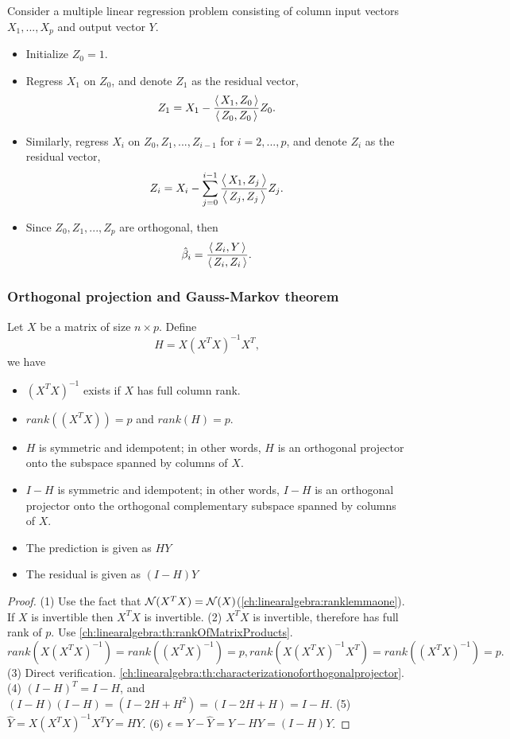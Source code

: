 \begin{refsection}
\begin{method}
Consider a multiple linear regression problem consisting of column input vectors $X_1,...,X_p$ and output vector $Y$.	
\begin{itemize}
	\item Initialize $Z_0 = 1$.
	\item Regress $X_1$ on $Z_0$, and denote $Z_1$ as the residual vector,
	$$Z_1 = X_1 - \frac{{\left< \, X_1,Z_0 \, \right>}}{{\left< \, Z_0,Z_0 \, \right>}}Z_0.$$
	\item Similarly, regress $X_i$ on $Z_0,Z_1,...,Z_{i-1}$ for $i=2,...,p$, and denote $Z_i$ as the residual vector,
	$$Z_i = X_i - \sum_{j=0}^{i-1}\frac{{\left< \, X_1,Z_j \, \right>}}{{\left< \, Z_j,Z_j \, \right>}}Z_j.$$
	
	\item Since $Z_0,Z_1,...,Z_p$ are orthogonal, then 
	$$\hat{\beta}_i =  \frac{ {\left< \, Z_i,Y \, \right>}}{{\left< \, Z_i,Z_i \, \right>}}.$$
\end{itemize}
\end{method}


\subsubsection{Orthogonal projection and Gauss-Markov theorem}

\begin{lemma}\label{ch:theory-of-statistics:th:propertylinearregression}
	Let $X$ be a matrix of size $n\times p$. 
	Define $$H = X(X^TX)^{-1}X^T,$$ we have
	\begin{itemize}
		\item $(X^TX)^{-1}$ exists if $X$ has full column rank.
		\item $rank((X^TX)) = p$ and $rank(H) = p$.
		\item $H$ is symmetric and idempotent; in other words, $H$ is an orthogonal projector onto the subspace spanned by columns of $X$.
		\item $I-H$ is symmetric and idempotent; in other words, $I-H$ is an orthogonal projector onto the orthogonal complementary subspace spanned by columns of $X$.
		\item The prediction is given as $HY$
		\item The residual is given as $(I-H)Y$
	\end{itemize}
\end{lemma}
\begin{proof}
	(1) Use the fact that $\mathcal{N}(X^TX) = \mathcal{N}(X)$(\autoref{ch:linearalgebra:ranklemmaone}). If $X$ is invertible then $X^TX$ is invertible.
	(2) $X^TX$ is invertible, therefore has full rank of $p$.  Use \autoref{ch:linearalgebra:th:rankOfMatrixProducts}. $$rank(X(X^TX)^{-1}) = rank((X^TX)^{-1}) = p, rank(X(X^TX)^{-1}X^T) = rank((X^TX)^{-1}) = p.$$
	(3) Direct verification. \autoref{ch:linearalgebra:th:characterizationoforthogonalprojector}.
	(4) $(I-H)^T = I - H$, and $(I-H)(I-H) = (I - 2H + H^2) = (I - 2H + H) = I - H$.
	(5) $\hat{Y} = X(X^TX)^{-1}X^TY = HY$.
	(6) $\epsilon = Y - \hat{Y} = Y - HY = (I-H)Y$.
\end{proof}



\end{refsection}
